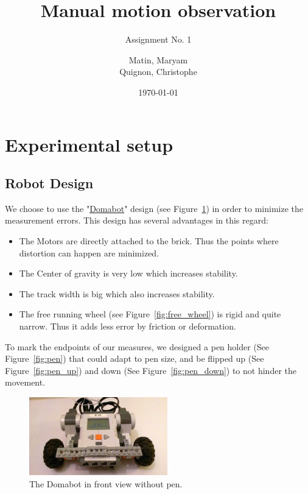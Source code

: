 \documentclass{scrartcl}
\begin{document}
\title{Manual motion observation}
\subtitle{Assignment No. 1}
\author{
  Matin, Maryam \\
  Quignon, Christophe
} 
\date{\today}


\maketitle



\section{Experimental setup}
\subsection{Robot Design}
We choose to use the "\href{http://www.damienkee.com/home/2011/8/20/domabot-classroom-robot-design.html}{Domabot}" design (see Figure~\ref{fig:front_view}) in order to minimize the measurement errors. This design has several advantages in this regard:
\begin{itemize}
\item The Motors are directly attached to the brick. Thus the points where distortion can happen are minimized.
\item The Center of gravity is very low which increases stability.
\item The track width is big which also increases stability.
\item The free running wheel (see Figure~\ref{fig:free_wheel}) is rigid and quite narrow. Thus it adds less error by friction or deformation.
\end{itemize}

To mark the endpoints of our measures, we designed a pen holder  (See Figure~\ref{fig:pen}) that could adapt to pen size, and be flipped up (See Figure~\ref{fig:pen_up}) and down (See Figure~\ref{fig:pen_down}) to not hinder the movement.

\begin{figure}
 \center
 \includegraphics[width= 6cm]{img/robot_front.jpg}
 \caption{The Domabot in front view without pen.}
 \label{fig:front_view}
\end{figure}
\end{document}
